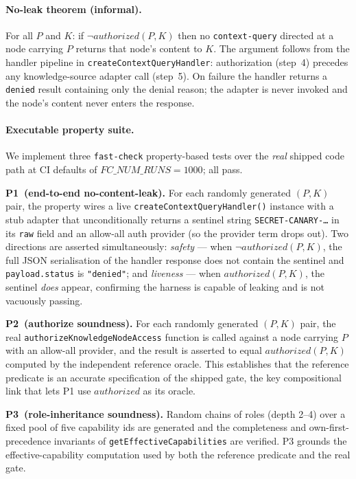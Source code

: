 \documentclass[10pt,twocolumn,letterpaper]{article}
\begin{document}
\paragraph{No-leak theorem (informal).}
For all $P$ and $K$: if $\neg\mathit{authorized}(P,K)$ then no \texttt{context-query} directed at a
node carrying $P$ returns that node's content to $K$. The argument follows from the handler pipeline
in \texttt{createContextQueryHandler}: authorization (step~4) precedes any knowledge-source adapter
call (step~5). On failure the handler returns a \texttt{denied} result containing only the denial
reason; the adapter is never invoked and the node's content never enters the response.

\paragraph{Executable property suite.}
We implement three \texttt{fast-check} property-based tests over the \emph{real} shipped code path
at CI defaults of $\mathit{FC\_NUM\_RUNS}=1000$; all pass.

\textbf{P1~(end-to-end no-content-leak).}
For each randomly generated $(P,K)$ pair, the property wires a live
\texttt{createContextQueryHandler()} instance with a stub adapter that unconditionally returns a
sentinel string \texttt{SECRET-CANARY-\ldots} in its \texttt{raw} field and an allow-all auth
provider (so the provider term drops out). Two directions are asserted simultaneously:
\emph{safety} --- when $\neg\mathit{authorized}(P,K)$, the full JSON serialisation of the handler
response does not contain the sentinel and \texttt{payload.status} is \texttt{"denied"}; and
\emph{liveness} --- when $\mathit{authorized}(P,K)$, the sentinel \emph{does} appear, confirming the
harness is capable of leaking and is not vacuously passing.

\textbf{P2~(authorize soundness).}
For each randomly generated $(P,K)$ pair, the real \texttt{authorizeKnowledgeNodeAccess} function
is called against a node carrying $P$ with an allow-all provider, and the result is asserted to equal
$\mathit{authorized}(P,K)$ computed by the independent reference oracle. This establishes that the
reference predicate is an accurate specification of the shipped gate, the key compositional link that
lets P1 use $\mathit{authorized}$ as its oracle.

\textbf{P3~(role-inheritance soundness).}
Random chains of roles (depth 2--4) over a fixed pool of five capability ids are generated and the
completeness and own-first-precedence invariants of \texttt{getEffectiveCapabilities} are verified.
P3 grounds the effective-capability computation used by both the reference predicate and the real
gate.
\end{document}
